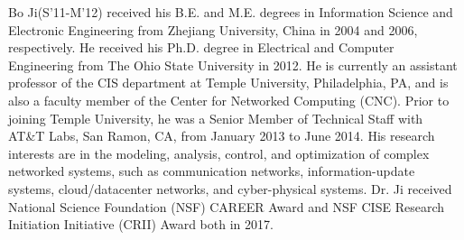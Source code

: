 \documentclass[10pt,journal,compsoc]{IEEEtran}
\begin{document}
\begin{IEEEbiography}{Bo Ji}(S'11-M'12)
received his B.E. and M.E. degrees in Information Science and Electronic 
Engineering from Zhejiang University, China in 2004 and 2006, respectively. 
He received his Ph.D. degree in Electrical and Computer Engineering from 
The Ohio State University in 2012. He is currently an assistant professor of 
the CIS department at Temple University, Philadelphia, PA, and is also a 
faculty member of the Center for Networked Computing (CNC). Prior to joining 
Temple University, he was a Senior Member of Technical Staff with AT\&T Labs, 
San Ramon, CA, from January 2013 to June 2014. His research interests are 
in the modeling, analysis, control, and optimization of complex networked systems, 
such as communication networks, information-update systems, cloud/datacenter 
networks, and cyber-physical systems.
Dr. Ji received National Science Foundation (NSF) CAREER Award and 
NSF CISE Research Initiation Initiative (CRII) Award both in 2017.
\end{IEEEbiography}

\clearpage

\appendices
\end{document}
